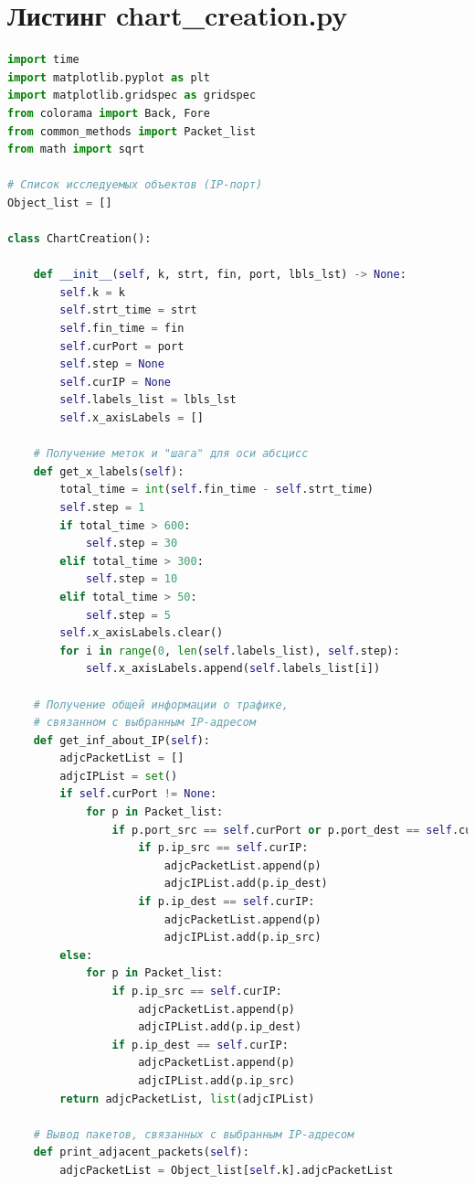 \documentclass[spec, och, diploma]{SCWorks}
\begin{document}
    \section{Листинг chart\_creation.py}

    \begin{lstlisting}[language=Python]
import time
import matplotlib.pyplot as plt
import matplotlib.gridspec as gridspec
from colorama import Back, Fore
from common_methods import Packet_list
from math import sqrt

# Список исследуемых объектов (IP-порт)
Object_list = []

class ChartCreation():

    def __init__(self, k, strt, fin, port, lbls_lst) -> None:
        self.k = k
        self.strt_time = strt
        self.fin_time = fin
        self.curPort = port
        self.step = None
        self.curIP = None
        self.labels_list = lbls_lst
        self.x_axisLabels = []

    # Получение меток и "шага" для оси абсцисс
    def get_x_labels(self):
        total_time = int(self.fin_time - self.strt_time)
        self.step = 1
        if total_time > 600:
            self.step = 30
        elif total_time > 300:
            self.step = 10
        elif total_time > 50:
            self.step = 5
        self.x_axisLabels.clear()
        for i in range(0, len(self.labels_list), self.step):
            self.x_axisLabels.append(self.labels_list[i])

    # Получение общей информации о трафике,
    # связанном с выбранным IP-адресом
    def get_inf_about_IP(self):
        adjcPacketList = []
        adjcIPList = set()
        if self.curPort != None:
            for p in Packet_list:
                if p.port_src == self.curPort or p.port_dest == self.curPort:
                    if p.ip_src == self.curIP:
                        adjcPacketList.append(p)
                        adjcIPList.add(p.ip_dest)
                    if p.ip_dest == self.curIP:
                        adjcPacketList.append(p)
                        adjcIPList.add(p.ip_src)
        else:
            for p in Packet_list:
                if p.ip_src == self.curIP:
                    adjcPacketList.append(p)
                    adjcIPList.add(p.ip_dest)
                if p.ip_dest == self.curIP:
                    adjcPacketList.append(p)
                    adjcIPList.add(p.ip_src)
        return adjcPacketList, list(adjcIPList)

    # Вывод пакетов, связанных с выбранным IP-адресом 
    def print_adjacent_packets(self):
        adjcPacketList = Object_list[self.k].adjcPacketList


\end{lstlisting}
\end{document}

